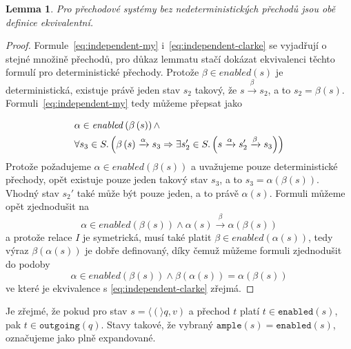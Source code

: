 \documentclass[10pt,a4paper,notitlepage]{report}
\newtheorem{lemma}     {Lemma}
\newcommand{\tuple}[1]{\langle #1 \rangle}
\begin{document}
\begin{lemma}
Pro přechodové systémy bez nedeterministických přechodů jsou obě definice ekvivalentní.
\end{lemma}

\begin{proof}
Formule~\ref{eq:independent-my} i~\ref{eq:independent-clarke} se vyjadřují o stejné množině přechodů, pro důkaz lemmatu stačí dokázat ekvivalenci těchto formulí pro deterministické přechody. Protože $\beta \in \mathit{enabled}(s)$ je deterministická, existuje právě jeden stav $s_2$ takový, že $s \xrightarrow{\beta} s_2$, a to $s_2 = \beta\left({s}\right)$. Formuli~\ref{eq:independent-my} tedy můžeme přepsat jako

\begin{equation}
\begin{split}
& \alpha \in \mathit{enabled}\left({\beta\left({s}\right)}\right)
\land \\
&\forall s_3 \in S \ldotp \left({
	\beta\left({s}\right) \xrightarrow{\alpha} s_3
	\Rightarrow
	\exists s_2' \in S \ldotp \left({
		s \xrightarrow{\alpha} s_2' \xrightarrow{\beta} s_3
	}\right)
}\right)
\end{split}
\end{equation}
Protože požadujeme $\alpha \in \mathit{enabled}\left({\beta\left({s}\right)}\right)$ a uvažujeme pouze deterministické přechody, opět existuje pouze jeden takový stav $s_3$, a to $s_3 = \alpha{\left({\beta\left({s}\right)}\right)}$. Vhodný stav $s_2'$ také může být pouze jeden, a to právě $\alpha\left({s}\right)$. Formuli můžeme opět zjednodušit na
\begin{equation}
\alpha \in \mathit{enabled}\left({\beta\left({s}\right)}\right)
\land
\alpha\left({s}\right) \xrightarrow{\beta} \alpha{\left({\beta\left({s}\right)}\right)}
\end{equation}
a protože relace $I$ je symetrická, musí také platit $\beta \in \mathit{enabled}\left({\alpha\left({s}\right)}\right)$, tedy výraz $\beta\left({\alpha\left({s}\right)}\right)$ je dobře definovaný, díky čemuž můžeme formuli zjednodušit do podoby
\begin{equation}
\alpha \in \mathit{enabled}\left({\beta\left({s}\right)}\right)
\land
\beta\left({\alpha\left({s}\right)}\right) = \alpha{\left({\beta\left({s}\right)}\right)}
\end{equation}
ve které je ekvivalence s \ref{eq:independent-clarke} zřejmá.
\end{proof}

Je zřejmé, že pokud pro stav $s = \tuple(q, v)$ a přechod $t$ platí $t \in \texttt{enabled}(s)$, pak $t \in \texttt{outgoing}(q)$. Stavy takové, že vybraný $\texttt{ample}(s) = \texttt{enabled}(s)$, označujeme jako plně expandované.
\end{document}

